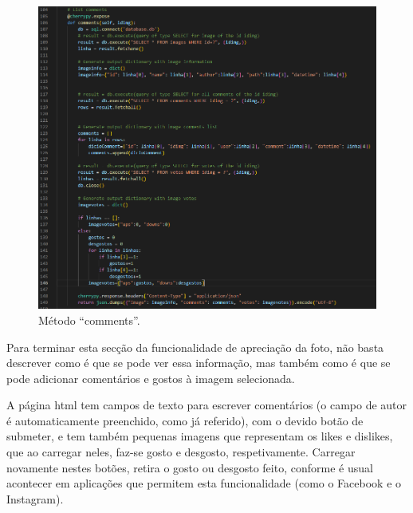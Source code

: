 \documentclass{report}
\begin{document}
 \begin{figure}[!hbtp]
        \centering
        \includegraphics[scale=0.50]{Images_code/11 - comments votes.png}
        \caption{\label{Estrutura}Método “comments”.}
\end{figure}

\newpage


 Para terminar esta secção da funcionalidade de apreciação da foto, não basta descrever como é que se pode ver essa informação, mas também como é que se pode adicionar comentários e gostos à imagem selecionada.

 \linebreak
 \bigskip
 
	A página html tem campos de texto para escrever comentários (o campo de autor é automaticamente preenchido, como já referido), com o devido botão de submeter, e tem também pequenas imagens que representam os likes e dislikes, que ao carregar neles, faz-se gosto e desgosto, respetivamente. Carregar novamente nestes botões, retira o gosto ou desgosto feito, conforme é usual acontecer em aplicações que permitem esta funcionalidade (como o Facebook e o Instagram).
\end{document}
